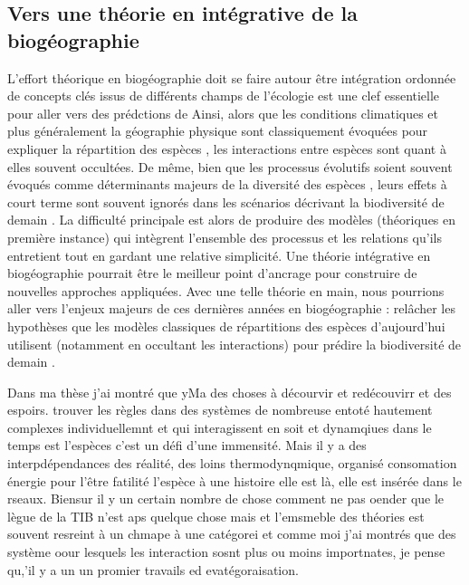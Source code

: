 \subsection*{Vers une théorie en intégrative de la
biogéographie}\label{vers-une-thuxe9orie-en-intuxe9grative-de-la-bioguxe9ographie}

L'effort théorique en biogéographie doit se faire autour être
intégration ordonnée de concepts clés issus de différents champs de
l'écologie \citep{Thuiller2013} est une clef essentielle pour aller vers
des prédctions de Ainsi, alors que les conditions climatiques et plus
généralement la géographie physique sont classiquement évoquées pour
expliquer la répartition des espèces \cite{Kearney2004}, les
interactions entre espèces sont quant à elles souvent occultées. De
même, bien que les processus évolutifs soient souvent évoqués comme
déterminants majeurs de la diversité des espèces \cite{Rosindell2011},
leurs effets à court terme sont souvent ignorés \cite{Parmesan2006} dans
les scénarios décrivant la biodiversité de demain \cite{Lavergne2010}.
La difficulté principale est alors de produire des modèles (théoriques
en première instance) qui intègrent l'ensemble des processus et les
relations qu'ils entretient \cite{Thuiller2013} tout en gardant une
relative simplicité. Une théorie intégrative en biogéographie pourrait
être le meilleur point d'ancrage pour construire de nouvelles approches
appliquées. Avec une telle théorie en main, nous pourrions aller vers
l'enjeux majeurs de ces dernières années en biogéographie : relâcher les
hypothèses que les modèles classiques de répartitions des espèces
d'aujourd'hui utilisent (notamment en occultant les interactions) pour
prédire la biodiversité de demain \cite{Guisan2011}.

Dans ma thèse j'ai montré que yMa des choses à décourvir et redécouvirr
et des espoirs. trouver les règles dans des systèmes de nombreuse entoté
hautement complexes individuellemnt et qui interagissent en soit et
dynamqiues dans le temps est l'espèces c'est un défi d'une immensité.
Mais il y a des interpdépendances des réalité, des loins
thermodynqmique, organisé consomation énergie pour l'être fatilité
l'espèce à une histoire elle est là, elle est insérée dans le rseaux.
Biensur il y un certain nombre de chose comment ne pas oender que le
lègue de la TIB n'est aps quelque chose mais et l'emsmeble des théories
est souvent resreint à un chmape à une catégorei et comme moi j'ai
montrés que des système oour lesquels les interaction sosnt plus ou
moins importnates, je pense qu,'il y a un un promier travails ed
evatégoraisation.

